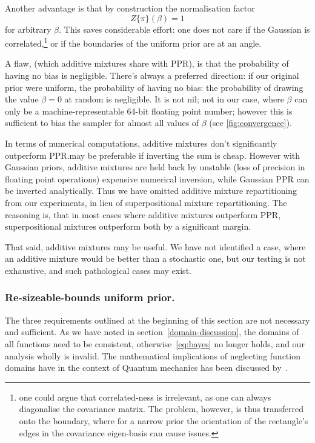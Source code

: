 \documentclass[usenatbib]{mnras}
\begin{document}
Another advantage is that by construction the normalisation factor
\[Z \{ \pi\}(\beta) = 1\] for arbitrary \(\beta\). This saves
considerable effort: one does not care if the Gaussian is
correlated,\footnote{one could argue that correlated-ness is irrelevant,
as one can always diagonalise the covariance matrix. The problem,
however, is thus transferred onto the boundary, where for a narrow
prior the orientation of the rectangle's edges in the covariance
eigen-basis can cause issues.} or if the boundaries of the
uniform prior are at an angle.

A flaw, (which additive mixtures share with PPR), is that the
probability of having no bias is negligible. There's always a
preferred direction: if our original prior were uniform, the
probability of having no bias: the probability of drawing the
value \(\beta=0\) at random is negligible. It is not nil; not in our
case, where \(\beta\) can only be a machine-representable 64-bit
floating point number; however this is sufficient to bias the
sampler for almost all values of \(\beta\) (see
\cref{fig:convergence}).

In terms of numerical computations, additive mixtures don't
significantly outperform PPR.\@It may be preferable if inverting
the sum is cheap. However with Gaussian priors, additive mixtures
are held back by unstable (loss of precision in floating point
operations) expensive numerical inversion, while Gaussian PPR can
be inverted analytically. Thus we have omitted additive mixture
repartitioning from our experiments, in lieu of superpositional
mixture repartitioning. The reasoning is, that in most cases where
additive mixtures outperform PPR, superpositional mixtures
outperform both by a significant margin.

That said, additive mixtures may be useful. We have not identified
a case, where an additive mixture would be better than a
stochastic one, but our testing is not exhaustive, and such
pathological cases may exist.

\subsubsection{Re-sizeable-bounds uniform prior.}\label{sec:orga67f872}

The three requirements outlined at the beginning of this section are
not necessary and sufficient. As we have noted in
section~\vref{domain-discussion}, the domains of all functions need to
be consistent, otherwise~\vref{eq:bayes} no longer holds, and our
analysis wholly is invalid. The mathematical implications of
neglecting function domains have in the context of Quantum mechanics
has been discussed by~\cite{Gieres_2000}.
\end{document}
